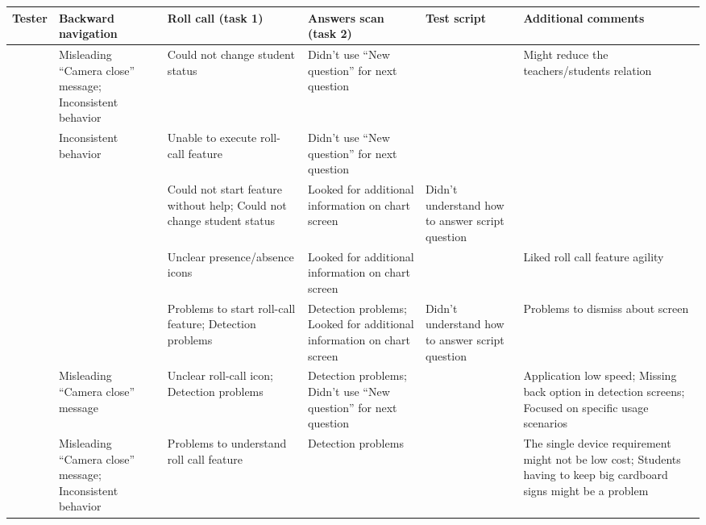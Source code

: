 \begin{table*}[!t]
    \begin{center}
        \renewcommand{\arraystretch}{1.5}
        \begin{tabular}{ p{} | >{\raggedright\arraybackslash}p{} | >{\raggedright\arraybackslash}p{} | >{\raggedright\arraybackslash}p{} | >{\raggedright\arraybackslash}p{} | >{\raggedright\arraybackslash}p{}}
            \hline
            \textbf{Tester} & \textbf{Backward navigation} & \textbf{Roll call (task 1)} & \textbf{Answers scan (task 2)} & \textbf{Test script} & \textbf{Additional comments} \\
            \hline
            \centering 1 & Misleading “Camera close” message; Inconsistent behavior & Could not change student status & Didn't use “New question” for next question & & Might reduce the teachers/students relation \\
            \hline
            \centering 2 & Inconsistent behavior & Unable to execute roll-call feature & Didn't use “New question” for next question & \\
            \hline
            \centering 3 & & Could not start feature without help; Could not change student status & Looked for additional information on chart screen & Didn't understand how to answer script question & \\
            \hline
            \centering 4 & & Unclear presence/absence icons & Looked for additional information on chart screen & & Liked roll call feature agility \\
            \hline
            \centering 5 & & Problems to start roll-call feature; Detection problems & Detection problems; Looked for additional information on chart screen & Didn't understand how to answer script question & Problems to dismiss about screen \\
            \hline
            \centering 6 & Misleading “Camera close” message & Unclear roll-call icon; Detection problems & Detection problems; Didn't use “New question” for next question & & Application low speed; Missing back option in detection screens; Focused on specific usage scenarios \\
            \hline
            \centering 7 & Misleading “Camera close” message; Inconsistent behavior & Problems to understand roll call feature & Detection problems & & The single device requirement might not be low cost; Students having to keep big cardboard signs might be a problem \\

\end{tabular}
\end{center}
\end{table*}
